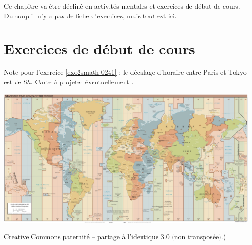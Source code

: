


Ce chapitre va être décliné en activités mentales et exercices de début de cours. Du coup il n'y a pas de fiche d'exercices, mais tout est ici.


\section{Exercices de début de cours}

\let\oldcite\cite
\renewcommand{\cite}[1]{}

\newpage

\vfill
{}
\vfill
\newpage
\vfill
{}
\newpage
{}
\vfill
\newpage
{}
\vfill
\newpage
{}
\vfill
\newpage
{}
\vfill
\newpage
{}
\vfill

\let\cite\oldcite
\newpage

Note pour l'exercice \ref{exo2smath-0241} : le décalage d'horaire entre Paris et Tokyo est de \( 8h\). Carte à projeter éventuellement :

\begin{center}
\includegraphics[width=\linewidth]{TimeZones.pdf}
\end{center}

\href{ http://creativecommons.org/licenses/by-sa/3.0/deed.fr }{Creative Commons paternité – partage à l'identique 3.0 (non transposée).)}

